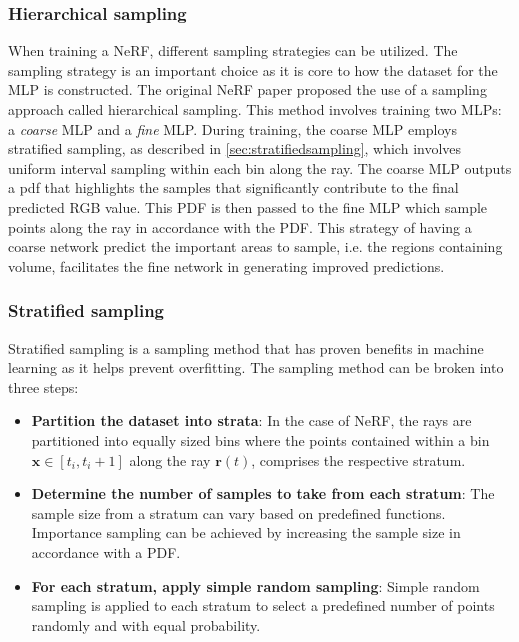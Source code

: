 \subsubsection{Hierarchical sampling} \label{sec:hierarchicalsampling}
When training a NeRF, different sampling strategies can be utilized. The sampling strategy is an important choice as it is core to how the dataset for the MLP is constructed. The original NeRF paper \cite{mildenhallNeRFRepresentingScenes2020} proposed the use of a sampling approach called hierarchical sampling. This method involves training two MLPs: a \textit{coarse} MLP and a \textit{fine} MLP. During training, the coarse MLP employs stratified sampling, as described in \autoref{sec:stratifiedsampling}, which involves uniform interval sampling within each bin along the ray. The coarse MLP outputs a \acrfull{pdf} that highlights the samples that significantly contribute to the final predicted RGB value. This PDF is then passed to the fine MLP which sample points along the ray in accordance with the PDF. This strategy of having a coarse network predict the important areas to sample, i.e. the regions containing volume, facilitates the fine network in generating improved predictions.


\subsubsection{Stratified sampling} \label{sec:stratifiedsampling}
Stratified sampling is a sampling method that has proven benefits in machine learning as it helps prevent overfitting. The sampling method can be broken into three steps:

\begin{itemize}
    \item \textbf{Partition the dataset into strata}: In the case of NeRF, the rays are partitioned into equally sized bins where the points contained within a bin $\pmb{x} \in [t_i, t_i+1]$ along the ray $\pmb{r}(t)$, comprises the respective stratum.
    \item \textbf{Determine the number of samples to take from each stratum}: The sample size from a stratum can vary based on predefined functions. Importance sampling can be achieved by increasing the sample size in accordance with a PDF.
    \item \textbf{For each stratum, apply simple random sampling}: Simple random sampling is applied to each stratum to select a predefined number of points randomly and with equal probability.
\end{itemize}

